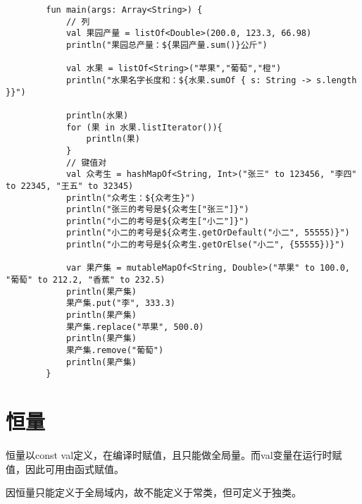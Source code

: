     \begin{verbatim}
        fun main(args: Array<String>) {
            // 列
            val 果园产量 = listOf<Double>(200.0, 123.3, 66.98)
            println("果园总产量：${果园产量.sum()}公斤")
        
            val 水果 = listOf<String>("苹果","葡萄","橙")
            println("水果名字长度和：${水果.sumOf { s: String -> s.length }}")
        
            println(水果)
            for (果 in 水果.listIterator()){
                println(果)
            }
            // 键值对
            val 众考生 = hashMapOf<String, Int>("张三" to 123456, "李四" to 22345, "王五" to 32345)
            println("众考生：${众考生}")
            println("张三的考号是${众考生["张三"]}")
            println("小二的考号是${众考生["小二"]}")
            println("小二的考号是${众考生.getOrDefault("小二", 55555)}")
            println("小二的考号是${众考生.getOrElse("小二", {55555})}")
        
            var 果产集 = mutableMapOf<String, Double>("苹果" to 100.0, "葡萄" to 212.2, "香蕉" to 232.5)
            println(果产集)
            果产集.put("李", 333.3)
            println(果产集)
            果产集.replace("苹果", 500.0)
            println(果产集)
            果产集.remove("葡萄")
            println(果产集)
        }
    \end{verbatim}

\section{恒量}
恒量以const val定义，在编译时赋值，且只能做全局量。而val变量在运行时赋值，因此可用由函式赋值。

因恒量只能定义于全局域内，故不能定义于常类，但可定义于独类。


